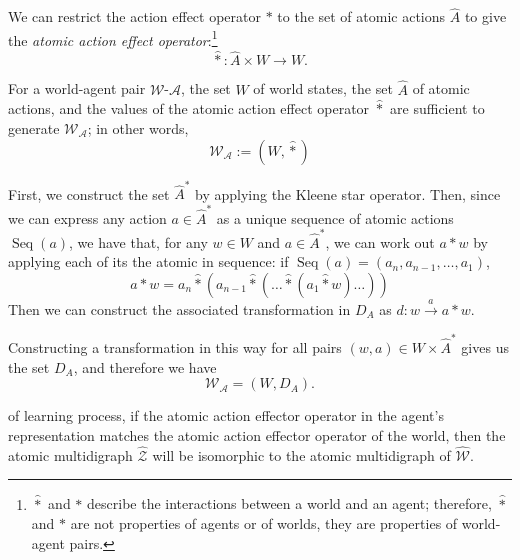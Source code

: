 We can restrict the action effect operator $\ast$ to the set of atomic actions $\hat{A}$ to give the \emph{atomic action effect operator}:\footnote{
    $\hat{\ast}$ and $\ast$ describe the interactions between a world and an agent; therefore, $\hat{\ast}$ and $\ast$ are not properties of agents or of worlds, they are properties of world-agent pairs.
}
\begin{equation}
    \hat{\ast}: \hat{A} \times W \to W.
\end{equation}

\begin{propositionE}
    For a world-agent pair $\mathscr{W}$-$\mathscr{A}$, the set $W$ of world states, the set $\hat{A}$ of atomic actions, and the values of the atomic action effect operator $\hat{\ast}$ are sufficient to generate $\mathscr{W}_{\mathscr{A}}$; in other words,
    \begin{equation}
        \mathscr{W}_{\mathscr{A}} := (W, \hat{\ast})
    \end{equation}
\end{propositionE}
\begin{proofE}
    First, we construct the set $\hat{A}^{*}$ by applying the Kleene star operator.
    Then, since we can express any action $a \in \hat{A}^{*}$ as a unique sequence of atomic actions $\operatorname{Seq}(a)$, we have that, for any $w \in W$ and $a \in \hat{A}^{*}$, we can work out $a \ast w$ by applying each of its the atomic in sequence:
    if $\operatorname{Seq}(a) = (a_{n}, a_{n-1}, \dots, a_{1})$,
    \begin{equation}
        a \ast w = a_{n} \hat{\ast} (a_{n-1} \hat{\ast} (\dots \hat{\ast} (a_{1} \hat{\ast} w)\dots))
    \end{equation}
    Then we can construct the associated transformation in $D_{A}$ as $d: w \xrightarrow{a} a \ast w$.
    
    Constructing a transformation in this way for all pairs $(w, a) \in W \times \hat{A}^{*}$ gives us the set $D_{A}$, and therefore we have
    \begin{equation}
        \mathscr{W}_{\mathscr{A}} = (W, D_{A}).
    \end{equation}
\end{proofE}


 of learning process, if the atomic action effector operator in the agent's representation matches the atomic action effector operator of the world, then the atomic multidigraph $\hat{\mathscr{Z}}$ will be isomorphic to the atomic multidigraph of $\hat{\mathscr{W}}$.


